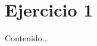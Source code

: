 \documentclass[chaptersright]{informeutn}
\begin{document}
\maketitle

\tableofcontents
\setcounter{page}{1}
\thispagestyle{plain}

\chapter{Ejercicio 1}
Contenido...
\end{document}
